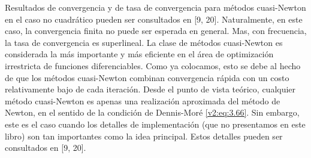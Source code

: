 Resultados de convergencia y de tasa de convergencia para métodos cuasi-Newton en el caso no cuadrático pueden ser consultados en [9, 20]. Naturalmente, en este caso, la convergencia finita no puede ser esperada en general. Mas, con frecuencia, la tasa de convergencia es superlineal. La clase de métodos cuasi-Newton es considerada la más importante y más eficiente en el área de optimización irrestricta de funciones diferenciables. Como ya colocamos, esto se debe al hecho de que los métodos cuasi-Newton combinan convergencia rápida con un costo relativamente bajo de cada iteración. Desde el punto de vista teórico, cualquier método cuasi-Newton es apenas una realización aproximada del método de Newton, en el sentido de la condición de Dennis-Moré \eqref{v2:eq:3.66}. Sin embargo, este es el caso cuando los detalles de implementación (que no presentamos en este libro) son tan importantes como la idea principal. Estos detalles pueden ser consultados en [9, 20].
